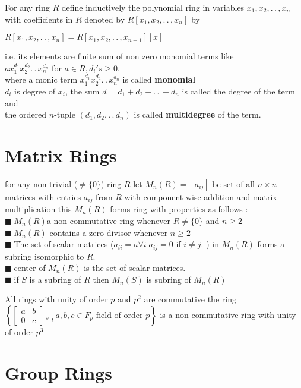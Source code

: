 \documentclass[11pt]{extarticle}
\newcommand{\w}[1]{\text{#1}}
\newcommand{\ck}{.\,.\,}
\newcommand{\tm}{\times}
\newcommand{\snote}[1]{{\footnotesize(#1)}}
\newcommand{\st}{\,{}_{s}|_t\,}
\newcommand{\tbx}[2][]{
	\begin{tcolorbox}[enhanced,breakable,size=small,colback=black!2!white,title={#1},arc is angular, arc=1.5mm,drop fuzzy shadow]
		#2
	\end{tcolorbox}
}
\newcommand{\y}{$\blacksquare\;$}
\begin{document}
\begin{multicols}{2}
\tbx{For any ring $ R $ define inductively the polynomial ring in variables $ x_1,x_2,\ck , x_n $ with coefficients in $ R $ denoted by $ R[x_1,x_2,\ck , x_n] $ by 
			\begin{center}
				$ R[x_1,x_2,\ck , x_n] =R[x_1,x_2,\ck , x_{n-1}][x] $
			\end{center}
			i.e. its elements are finite sum of non zero monomial terms like \\
			$ ax_1^{d_1}x_2^{d_2}\ck x_n^{d_n} $ for $ a\in R, d_i's\geq 0 .$\\
			where a monic term $  x_1^{d_1}x_2^{d_2}\ck x_n^{d_n} $ is called \textbf{monomial}\\
			$ d_i $ is degree of $ x_i $, the sum $ d=d_1+d_2+\ck +d_n $ is called the degree of the term and \\
			the ordered $ n $-tuple $ (d_1,d_2,\ck d_n) $  is called \textbf{ multidegree } of the term.}
			
			\vspace*{1em}
		\section{Matrix Rings}

\tbx{for any non trivial \snote{$\neq \{0\} $} ring $ R $ let $ M_n(R) =[a_{ij}]$ be set of all $ n\tm n $ matrices with entries $ a_{ij} $ from $ R $ with component wise addition and matrix multiplication this $ M_n(R) $ forms ring with properties as follows :\\
\y $ M_n(R) $a non commutative ring whenever $ R\neq \{0\} $ and $ n\geq 2 $\\
\y $ M_n(R) $ contains a zero divisor whenever $ n\geq 2 $\\
\y The set of scalar matrices \snote{$ a_{ii}=a \forall i\; a_{ij}=0 $ if $ i\neq j. $ } in $ M_n(R)$ forms a subring isomorphic to $ R .$\\
\y center of $ M_n(R) $ is the set of scalar matrices.\\
\y if $ S $ is a subring of $ R $ then $ M_n(S) $ is subring of $ M_n(R) $}
\tbx{ All rings with unity of order $ p $ and $ p^2 $ are commutative the ring $ \left\lbrace\begin{bmatrix}
		a&b\\
		0&c
	\end{bmatrix}\st a,b,c\in F_p  \w{ field of order } p\right\rbrace$ is a non-commutative ring with unity of order $ p^3 $  }

		\section{Group Rings}


\end{multicols}
\end{document}
